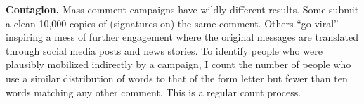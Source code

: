 \textbf{Contagion.} Mass-comment campaigns have wildly different results. Some submit a clean 10,000 copies of (signatures on) the same comment. Others ``go viral''---inspiring a mess of further engagement where the original messages are translated through social media posts and news stories.
To identify people who were plausibly mobilized indirectly by a campaign, I count the number of people who use a similar distribution of words to that of the form letter but fewer than ten words matching any other comment. This is a regular count process.

















